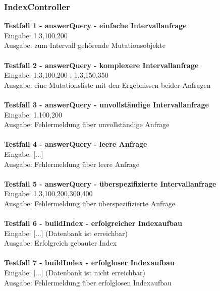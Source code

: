 \subsubsection{IndexController}
\textbf{Testfall 1 - answerQuery - einfache Intervallanfrage}\\
Eingabe: 1,3,100,200\\
Ausgabe: zum Intervall gehörende Mutationsobjekte\\
\\
\textbf{Testfall 2 - answerQuery - komplexere Intervallanfrage}\\
Eingabe: 1,3,100,200 ; 1,3,150,350\\
Ausgabe: eine Mutationsliste mit den Ergebnissen beider Anfragen\\
\\
\textbf{Testfall 3 - answerQuery - unvollständige Intervallanfrage}\\
Eingabe: 1,100,200\\
Ausgabe: Fehlermeldung über unvollständige Anfrage\\
\\
\textbf{Testfall 4 - answerQuery - leere Anfrage}\\
Eingabe: [...]\\
Ausgabe: Fehlermeldung über leere Anfrage\\
\\
\textbf{Testfall 5 - answerQuery - überspezifizierte Intervallanfrage}\\
Eingabe: 1,3,100,200,300,400\\
Ausgabe: Fehlermeldung über überspezifizierte Anfrage\\
\\
\textbf{Testfall 6 - buildIndex - erfolgreicher Indexaufbau}\\
Eingabe: [...] (Datenbank ist erreichbar)\\
Ausgabe: Erfolgreich gebauter Index\\
\\
\textbf{Testfall 7 - buildIndex - erfolgloser Indexaufbau}\\
Eingabe: [...] (Datenbank ist nicht erreichbar)\\
Ausgabe: Fehlermeldung über erfolglosen Indexaufbau
\newpage
